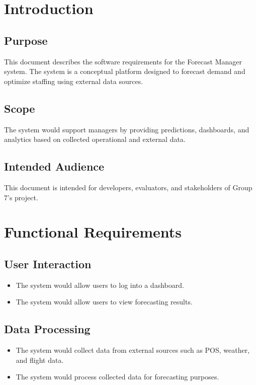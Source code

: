 \documentclass[12pt]{report}
\begin{document}
\section{Introduction}

\subsection{Purpose}
This document describes the software requirements for the Forecast Manager system. The system is a conceptual platform designed to forecast demand and optimize staffing using external data sources.

\subsection{Scope}
The system would support managers by providing predictions, dashboards, and analytics based on collected operational and external data.

\subsection{Intended Audience}
This document is intended for developers, evaluators, and stakeholders of Group 7’s project.

\section{Functional Requirements}

\subsection{User Interaction}
\begin{itemize}
    \item The system would allow users to log into a dashboard.
    \item The system would allow users to view forecasting results.
\end{itemize}

\subsection{Data Processing}
\begin{itemize}
    \item The system would collect data from external sources such as POS, weather, and flight data.
    \item The system would process collected data for forecasting purposes.
\end{itemize}
\end{document}
